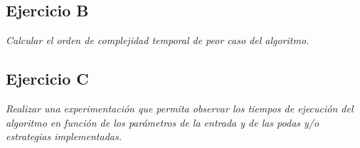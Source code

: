 \subsection{Ejercicio B}

\textit{Calcular el orden de complejidad temporal de peor caso del algoritmo.}
\medskip

\subsection{Ejercicio C}

\textit{Realizar una experimentación que permita observar los tiempos de ejecución del algoritmo en función de los parámetros de la entrada y de las podas y/o estrategias implementadas.}
\medskip
